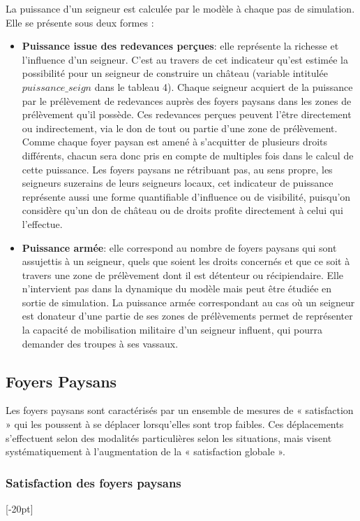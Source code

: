 \documentclass[12pt, a4paper, oneside]{book}
\begin{document}
	La puissance d'un seigneur est calculée par le modèle à chaque pas de simulation.
	Elle se présente sous deux formes :
	\begin{itemize}
	\item \textbf{Puissance issue des redevances perçues}: elle représente la richesse et l'influence d'un seigneur.
	C'est au travers de cet indicateur qu'est estimée la possibilité pour un seigneur de construire un château (variable intitulée $puissance\_seign$ dans le tableau 4).
	Chaque seigneur acquiert de la puissance par le prélèvement de redevances auprès des foyers paysans dans les zones de prélèvement qu'il possède.
	Ces redevances perçues peuvent l'être directement ou indirectement, via le don de tout ou partie d'une zone de prélèvement.
	Comme chaque foyer paysan est amené à s'acquitter de plusieurs droits différents, chacun sera donc pris en compte de multiples fois dans le calcul de cette puissance.
	Les foyers paysans ne rétribuant pas, au sens propre, les seigneurs suzerains de leurs seigneurs locaux, cet indicateur de puissance représente aussi une forme quantifiable d'influence ou de visibilité, puisqu'on considère qu'un don de château ou de droits profite directement à celui qui l'effectue.
	
	\item \textbf{Puissance armée}: elle correspond au nombre de foyers paysans qui sont assujettis à un seigneur, quels que soient les droits concernés et que ce soit à travers une zone de prélèvement dont il est détenteur ou récipiendaire.
	Elle n'intervient pas dans la dynamique du modèle mais peut être étudiée en sortie de simulation.
	La puissance armée correspondant au cas où un seigneur est donateur d'une partie de ses zones de prélèvements permet de représenter la capacité de mobilisation militaire d'un seigneur influent, qui pourra demander des troupes à ses vassaux.
	\end{itemize}

	\subsection{Foyers Paysans}
	
	Les foyers paysans sont caractérisés par un ensemble de mesures de « satisfaction » qui les poussent à se déplacer lorsqu'elles sont trop faibles.
	Ces déplacements s'effectuent selon des modalités particulières selon les situations, mais visent systématiquement à l'augmentation de la « satisfaction globale ».
	
	\subsubsection{Satisfaction des foyers paysans}[-20pt]
\end{document}
